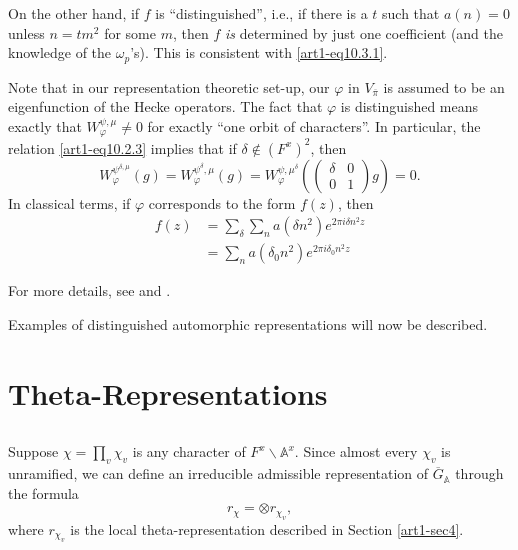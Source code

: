On the other hand, if $f$ is ``distinguished'', i.e., if there is a $t$ such that $a(n)=0$ unless $n=tm^{2}$ for some $m$, then $f$ {\em is} determined by just one coefficient (and the knowledge of the $\omega_{p}$'s). This is consistent with \eqref{art1-eq10.3.1}.

Note that in our representation theoretic set-up, our $\varphi$ in $V_{\overline{\pi}}$ is assumed to be an eigenfunction of the Hecke operators. The fact that $\varphi$ is distinguished means exactly that $W^{\psi,\mu}_{\varphi}\neq 0$ for exactly ``one orbit of characters''. In particular, the relation \eqref{art1-eq10.2.3} implies that if $\delta\not\in (F^{x})^{2}$, then
$$
W^{\psi^{\delta,\mu}}_{\varphi}(g)=W^{\psi^{\delta},\mu}_{\varphi}(g)=W^{\psi,\mu^{\delta}}_{\varphi}\left(\left(\begin{matrix} \delta & 0\\ 0 & 1\end{matrix}\right)g\right)=0.
$$
In classical terms, if $\varphi$ corresponds to the form $f(z)$, then 
\begin{align*}
f(z) &= \sum\limits_{\delta}\sum\limits_{n}a(\delta n^{2})e^{2\pi i\delta n^{2}z}\\
&= \sum\limits_{n}a(\delta_{0}n^{2})e^{2\pi i\delta_{0}n^{2}z}
\end{align*}

For more details, see \cite{GePS2} and \cite{Shim}.

Examples of distinguished automorphic representations will now be described.

\section{Theta-Representations}\label{art1-sec11}

\subsection{}\label{art1-sec11.1}
Suppose $\chi=\prod\limits_{v}\chi_{v}$ is any character of $F^{x}\backslash \mathbb{A}^{x}$. Since almost every $\chi_{v}$ is unramified, we can define an irreducible admissible representation of $\overline{G}_{\mathbb{A}}$ through the formula
$$
r_{\chi}=\otimes r_{\chi_{v}},
$$
where $r_{\chi_{v}}$ is the local theta-representation described in Section \ref{art1-sec4}.

